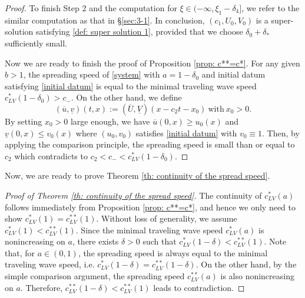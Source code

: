 \documentclass[11pt,a4paper]{article}
\numberwithin{equation}{section}
\numberwithin{figure}{section}
\begin{document}
\begin{proof}
To finish Step 2 and the computation for $\xi\in(-\infty,\xi_1-\delta_4]$, we refer to the similar computation as that in \S\ref{sec:3-1}.
In conclusion, $(c_1,U_0,V_0)$ is a super-solution satisfying \eqref{def: super solution 1}, provided that we choose $\delta_0+\delta_*$ sufficiently small.
    

    Now we are ready to finish the proof of Proposition \ref{prop: c**=c*}. For any given $b>1$, the spreading speed of \eqref{system} with $a=1-\delta_0$ and initial datum satisfying \eqref{initial datum}  is equal to the minimal traveling wave speed $c^*_{LV}(1-\delta_0)>c_-$. On the other hand, we define 
    $$(\overline u,\underline v)(t,x):=(\overline U,\underline V)(x-c_2t-x_0)\ \text{with}\ x_0>0.$$ 
    By setting $x_0>0$ large enough, we have $\overline u(0,x)\ge u_0(x)$ and $\underline v(0,x)\le v_0(x)$ where $(u_0,v_0)$ satisfies \eqref{initial datum} with $v_0\equiv 1$. Then, by applying the comparison principle, the spreading speed is small than or equal to $c_2$ which contradicts to $c_2<c_-<c^*_{LV}(1-\delta_0)$.
\end{proof}

Now, we are ready to prove Theorem \ref{th: continuity of the spread speed}.

\begin{proof}[Proof of Theorem \ref{th: continuity of the spread speed}]
The continuity of $c^*_{LV}(a)$ follows immediately from Proposition \ref{prop: c**=c*}, and hence we only need to show $c^*_{LV}(1)=c^{**}_{LV}(1)$.
Without loss of generality, we assume $c^*_{LV}(1)<c^{**}_{LV}(1)$. Since the minimal traveling wave speed $c^*_{LV}(a)$ is nonincreasing on $a$, there exists $\delta>0$ such that $c^*_{LV}(1-\delta)<c^{**}_{LV}(1)$. Note that, for $a\in (0,1)$, the spreading speed is always equal to the minimal traveling wave speed, i.e.  $c^*_{LV}(1-\delta)=c^{**}_{LV}(1-\delta)$. On the other hand, by the simple comparison argument, the spreading speed $c^{**}_{LV}(a)$ is also nonincreasing on $a$. Therefore, $c^{**}_{LV}(1-\delta)<c^{**}_{LV}(1)$ leads to contradiction.
\end{proof}

\end{document}
